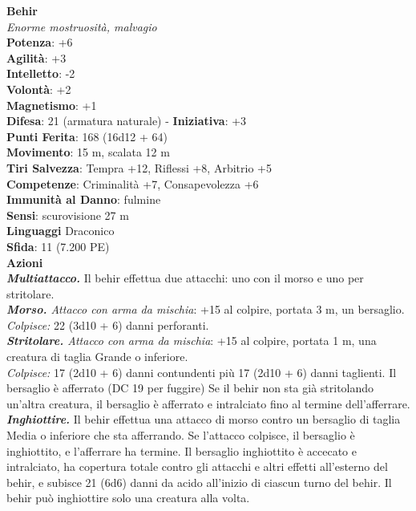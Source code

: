 \begin{multicols}{2}
\medskip\textbf{Behir}\\
\emph{Enorme mostruosità, malvagio}\\
\textbf{Potenza}: +6\\
\textbf{Agilità}: +3\\
\textbf{Intelletto}: -2\\
\textbf{Volontà}: +2\\
\textbf{Magnetismo}: +1\\
\textbf{Difesa}: 21 (armatura naturale) - \textbf{Iniziativa}: +3\\
\textbf{Punti Ferita}: 168 (16d12 + 64)\\
\textbf{Movimento}: 15 m, scalata 12 m\\
\textbf{Tiri Salvezza}: Tempra +12, Riflessi +8, Arbitrio +5\\
\textbf{Competenze}: Criminalità +7, Consapevolezza +6\\
\textbf{Immunità al Danno}: fulmine\\
\textbf{Sensi}: scurovisione 27 m\\
\textbf{Linguaggi} Draconico\\
\textbf{Sfida}: 11 (7.200 PE)\smallskip\\
\smallskip\textbf{Azioni}\\
\emph{\textbf{Multiattacco.}} Il behir effettua due attacchi: uno con il morso e uno per stritolare.\\
\emph{\textbf{Morso.} Attacco con arma da mischia}: +15 al colpire, portata 3 m, un bersaglio.\\
\emph{Colpisce:} 22 (3d10 + 6) danni perforanti.\\
\emph{\textbf{Stritolare.} Attacco con arma da mischia}: +15 al colpire, portata 1 m, una creatura di taglia Grande o inferiore.\\
\emph{Colpisce:} 17 (2d10 + 6) danni contundenti più 17 (2d10 + 6) danni taglienti. Il bersaglio è afferrato (DC  19 per fuggire) Se il behir non sta già stritolando un'altra creatura, il bersaglio è afferrato e intralciato fino al termine dell'afferrare.\\
\emph{\textbf{Inghiottire.}} Il behir effettua una attacco di morso contro un bersaglio di taglia Media o inferiore che sta afferrando. Se l'attacco colpisce, il bersaglio è inghiottito, e l'afferrare ha termine. Il bersaglio inghiottito è accecato e intralciato, ha copertura totale contro gli attacchi e altri effetti all'esterno del behir, e subisce 21 (6d6) danni da acido all'inizio di ciascun turno del behir. Il behir può inghiottire solo una creatura alla volta.\\

\end{multicols}
